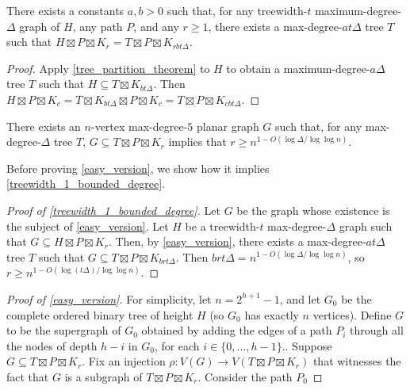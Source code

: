 \documentclass{patmorin}
\begin{document}
\begin{cor}
  There exists a constants $a,b>0$ such that, for any treewidth-$t$ maximum-degree-$\Delta$ graph of $H$, any path $P$, and any $r\ge 1$, there exists a max-degree-$at\Delta$ tree $T$ such that
  $H\boxtimes P\boxtimes K_r = T\boxtimes P\boxtimes K_{rbt\Delta}$.
\end{cor}

\begin{proof}
  Apply \cref{tree_partition_theorem} to $H$ to obtain a maximum-degree-$a\Delta$ tree $T$ such that $H\subseteq T\boxtimes K_{bt\Delta}$.  Then $H\boxtimes P\boxtimes K_{c} = T\boxtimes K_{bt\Delta}\boxtimes P\boxtimes K_c=T\boxtimes P\boxtimes K_{cbt\Delta}$.
\end{proof}

\begin{lem}\label{easy_version}
  There exists an $n$-vertex max-degree-$5$ planar graph $G$ such that, for any max-degree-$\Delta$ tree $T$, $G\subseteq T\boxtimes P\boxtimes K_r$ implies that $r\ge n^{1-O(\log\Delta/\log\log n)}$.
\end{lem}

Before proving \cref{easy_version}, we show how it implies \cref{treewidth_1_bounded_degree}.

\begin{proof}[Proof of \cref{treewidth_1_bounded_degree}]
  Let $G$ be the graph whose existence is the subject of \cref{easy_version}.
  Let $H$ be a treewidth-$t$ max-degree-$\Delta$ graph such that $G\subseteq H\boxtimes P\boxtimes K_r$.  Then, by \cref{easy_version}, there exists a max-degree-$at\Delta$ tree $T$ such that $G\subseteq T\boxtimes P\boxtimes K_{brt\Delta}$.  Then $brt\Delta = n^{1-O(\log\Delta/\log\log n)}$, so $r\ge n^{1-O(\log (t\Delta)/\log\log n)}$.
\end{proof}

\begin{proof}[Proof of \cref{easy_version}]
  For simplicity, let $n=2^{h+1}-1$, and let $G_0$ be the complete ordered binary tree of height $H$ (so $G_0$ has exactly $n$ vertices).  Define $G$ to be the supergraph of $G_0$ obtained by adding the edges of a path $P_i$ through all the nodes of depth $h-i$ in $G_0$, for each $i\in\{0,\ldots,h-1\}$..  Suppose $G\subseteq T\boxtimes P\boxtimes K_r$.  Fix an injection $\rho:V(G)\to V(T\boxtimes P\boxtimes K_r)$ that witnesses the fact that $G$ is a subgraph of $T\boxtimes P\boxtimes K_r$. Consider the path $P_0$ 
\end{proof}





\end{document}
